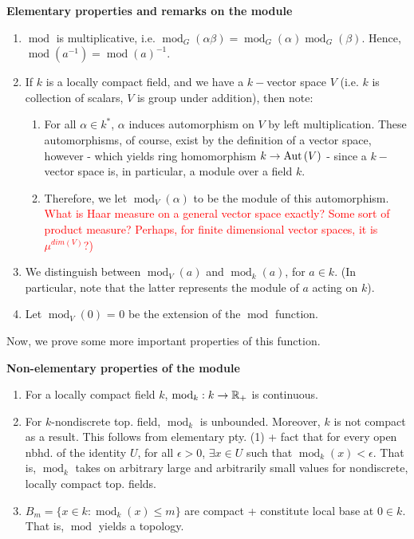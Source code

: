 \documentclass{article}
\DeclareMathOperator{\modl}{mod}
\DeclareMathOperator{\aut}{Aut}
\begin{document}
\textbf{Elementary properties and remarks on the module}

\begin{enumerate}
    \item $\modl$ is multiplicative, i.e. $\modl_G(\alpha \beta) = \modl_G(\alpha)\modl_G(\beta)$. Hence, $\modl(a^{-1}) = \modl(a)^{-1}$.
    \item If $k$ is a locally compact field, and we have a $k-$vector space $V$ (i.e. $k$ is collection of scalars, $V$ is group under addition), then note:

    \begin{enumerate}
        \item For all $\alpha \in k^*$, $\alpha$ induces automorphism on $V$ by left multiplication. These automorphisms, of course, exist by the definition of a vector space, however - which yields ring homomorphism $k \ra \aut{(V)}$ - since a $k-$vector space is, in particular, a module over a field $k$.
        \item Therefore, we let $\modl_{V}(\alpha)$ to be the module of this automorphism. \textcolor{red}{What is Haar measure on a general vector space exactly? Some sort of product measure? Perhaps, for finite dimensional vector spaces, it is $\mu^{dim(V)}$?)}
    \end{enumerate}
    \item We distinguish between $\modl_V(a)$ and $\modl_k(a)$, for $a \in k$. (In particular, note that the latter represents the module of $a$ acting on $k$).
    \item Let $\modl_V(0)$ = 0 be the extension of the $\modl$ function.
\end{enumerate}

Now, we prove some more important properties of this function.

\textbf{Non-elementary properties of the module}
\begin{enumerate}
    \item For a locally compact field $k$, $\modl_k:k \ra \R_{+}$ is continuous.
    \item For $k$-nondiscrete top. field, $\modl_k$ is unbounded. Moreover, $k$ is not compact as a result. This follows from elementary pty. (1) + fact that for every open nbhd. of the identity $U$, for all $\epsilon > 0$, $\exists x \in U$ such that $\modl_k(x) < \epsilon$. That is, $\modl_k$ takes on arbitrary large and arbitrarily small values for nondiscrete, locally compact top. fields.
    \item $B_m = \{x \in k: \modl_k(x) \leq m \}$ are compact + constitute local base at $0 \in k$. That is, $\modl$ yields a topology.
\end{enumerate}
\end{document}
